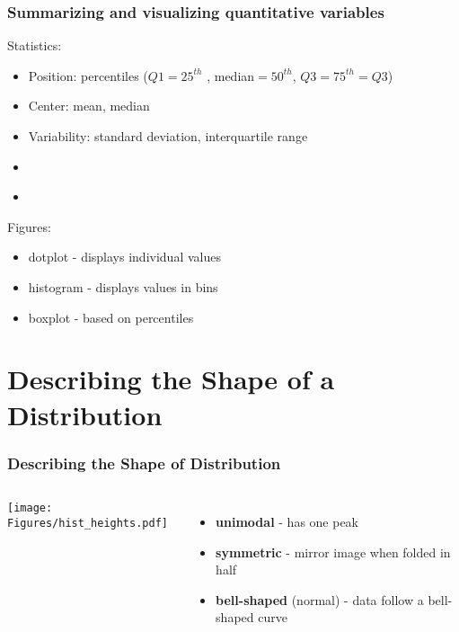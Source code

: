 \begin{frame}[label=summarizing]
\frametitle{Summarizing and visualizing quantitative variables}
Statistics:
\begin{itemize}
    \item Position: percentiles ($Q1=25^{th}$ , median$=50^{th}$, $Q3=75^{th}=Q3$)
    \item Center: mean, median
    \item Variability: standard deviation, interquartile range
    \item[] \hyperlink{meansd}{} \hyperlink{percentiles}{}
    \item[]
\end{itemize}
Figures:
\begin{itemize}
    \item dotplot - displays individual values
    \item histogram - displays values in bins
    \item boxplot - based on percentiles \hyperlink{boxplot}{}
\end{itemize}
\end{frame}

\section[Shape]{Describing the Shape of a Distribution}
\begin{frame}
\end{frame}

\begin{frame}
\frametitle{Describing the Shape of Distribution}
\begin{columns}
\texttt{[image: Figures/hist\_heights.pdf]}
\begin{itemize}
    \item
    \textbf{unimodal} - has one peak
    \item
    \textbf{symmetric} - mirror image when folded in half
    \item
    \textbf{bell-shaped} (normal) - data follow a bell-shaped curve
\end{itemize}
\end{columns}
\end{frame}

